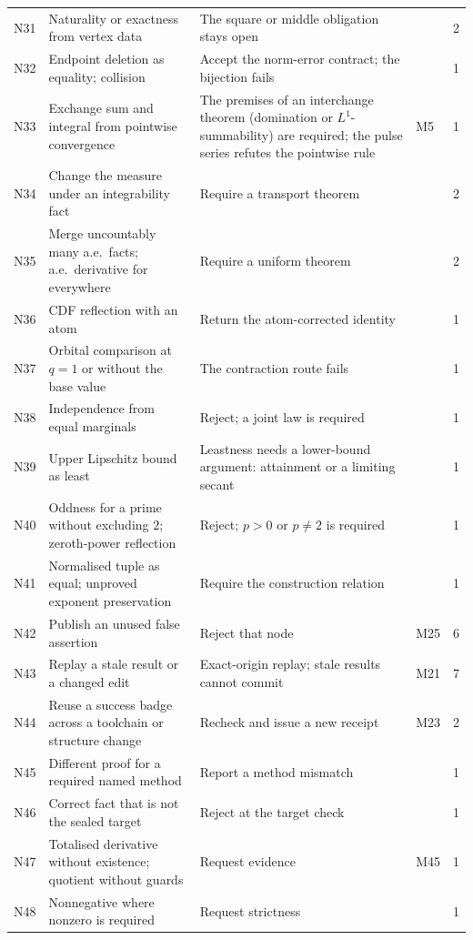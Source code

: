 {\begin{longtable}{@{}L{8mm}L{56mm}L{60mm}L{9mm}r@{}}
N31 & Naturality or exactness from vertex data & The square or middle obligation stays open & & 2\\
N32 & Endpoint deletion as equality;  collision & Accept the norm-error contract; the bijection fails & & 1\\
N33 & Exchange sum and integral from pointwise convergence & The premises of an interchange theorem (domination or $L^1$-summability) are required; the pulse series refutes the pointwise rule & M5 & 1\\
N34 & Change the measure under an integrability fact & Require a transport theorem & & 2\\
N35 & Merge uncountably many a.e.\ facts; a.e.\ derivative for everywhere & Require a uniform theorem & & 2\\
N36 & CDF reflection with an atom & Return the atom-corrected identity & & 1\\
N37 & Orbital comparison at $q=1$ or without the base value & The contraction route fails & & 1\\
N38 & Independence from equal marginals & Reject; a joint law is required & & 1\\
N39 & Upper Lipschitz bound as least & Leastness needs a lower-bound argument: attainment or a limiting secant & & 1\\
N40 & Oddness for a prime without excluding $2$; zeroth-power reflection & Reject; $p>0$ or $p\ne2$ is required & & 1\\
N41 & Normalised tuple as equal; unproved exponent preservation & Require the construction relation & & 1\\
N42 & Publish an unused false assertion & Reject that node & M25 & 6\\
N43 & Replay a stale result or a changed edit & Exact-origin replay; stale results cannot commit & M21 & 7\\
N44 & Reuse a success badge across a toolchain or structure change & Recheck and issue a new receipt & M23 & 2\\
N45 & Different proof for a required named method & Report a method mismatch & & 1\\
N46 & Correct fact that is not the sealed target & Reject at the target check & & 1\\
N47 & Totalised derivative without existence; quotient without guards & Request  evidence & M45 & 1\\
N48 & Nonnegative where nonzero is required & Request strictness & & 1\\

\end{longtable}}
